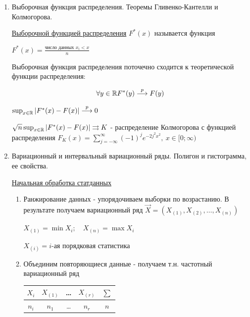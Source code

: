 \documentclass[12pt]{article}
\begin{document}
\begin{enumerate}
    \item Выборочная функция распределения. Теоремы Гливенко-Кантелли и Колмогорова.

    \Def \hyperlink{selective_distribution_function}{Выборочной функцией распределения} $F^*(x)$ называется функция 
    
    $F^*(x) = \frac{\text{число данных } x_i < x}{n}$

    \begin{MyTheorem}
        \Ths Выборочная функция распределения поточечно сходится к теоретической функции распределения:

        \[\forall y \in \mathbb{R} F^*(y) \overset{p}{\longrightarrow} F(y)\]
    \end{MyTheorem}

    \begin{MyTheorem}
         $\sup_{x \in \mathbb{R}} |F^*(x) - F(x)| \overset{p}{\longrightarrow} 0$
    \end{MyTheorem}

    \begin{MyTheorem}
         $\sqrt{n} \sup_{x \in \mathbb{R}} |F^*(x) - F(x)| \rightrightarrows K$ - распределение Колмогорова с 
        функцией распределения $F_K(x) = \sum_{j = -\infty}^{\infty} (-1)^j e^{-2 j^2 x^2}, \ x \in [0;\infty)$
    \end{MyTheorem}

    \item Вариационный и интервальный вариационный ряды. Полигон и гистограмма, ее свойства.

        
    \hyperlink{initial_data_processing}{Начальная обработка статданных}

    \begin{enumerate}
        \item Ранжирование данных - упорядочиваем выборки по возрастанию. В результате получаем вариационный ряд $\vec{X} = (X_{(1)}, X_{(2)}, \dots, X_{(n)})$

        $X_{(1)} = \min X_i; \quad X_{(n)} = \max X_i$

        $X_{(i)} = i$-ая порядковая статистика

        \item Объединим повторяющиеся данные - получаем т.н. частотный вариационный ряд

        \begin{tabular}{c|c|c|c|c}
            $X_i$ & $X_{(1)}$ & \dots & $X_{(r)}$ & $\sum$ \\ 
            \hline
            $n_i$ & $n_1$ & \dots & $n_r$ & $n$ \\ 
        \end{tabular}


\end{enumerate}
\end{enumerate}
\end{document}
